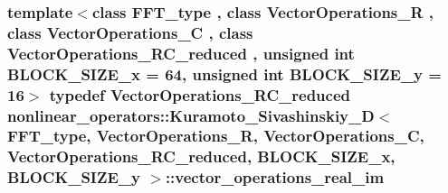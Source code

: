 \hypertarget{classnonlinear__operators_1_1Kuramoto__Sivashinskiy__2D_a26d633d58985865afc2bc593fcac3f46}{
\subsubsection[{vector\-\_\-operations\-\_\-real\-\_\-im}]{\setlength{\rightskip}{0pt plus 5cm}template$<$class F\-F\-T\-\_\-type , class Vector\-Operations\-\_\-\-R , class Vector\-Operations\-\_\-\-C , class Vector\-Operations\-\_\-\-R\-C\-\_\-reduced , unsigned int B\-L\-O\-C\-K\-\_\-\-S\-I\-Z\-E\-\_\-x = 64, unsigned int B\-L\-O\-C\-K\-\_\-\-S\-I\-Z\-E\-\_\-y = 16$>$ typedef Vector\-Operations\-\_\-\-R\-C\-\_\-reduced {\bf nonlinear\-\_\-operators\-::\-Kuramoto\-\_\-\-Sivashinskiy\-\_\-D}$<$ F\-F\-T\-\_\-type, Vector\-Operations\-\_\-\-R, Vector\-Operations\-\_\-\-C, Vector\-Operations\-\_\-\-R\-C\-\_\-reduced, B\-L\-O\-C\-K\-\_\-\-S\-I\-Z\-E\-\_\-x, B\-L\-O\-C\-K\-\_\-\-S\-I\-Z\-E\-\_\-y $>$\-::{\bf vector\-\_\-operations\-\_\-real\-\_\-im}}}\label{classnonlinear__operators_1_1Kuramoto__Sivashinskiy__2D_a26d633d58985865afc2bc593fcac3f46}


